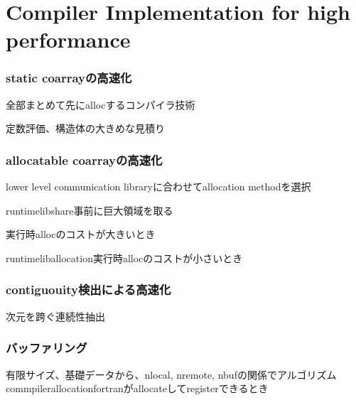 \section{Compiler Implementation for high performance}\label{sec:compiler}


\subsubsection{static coarrayの高速化}

全部まとめて先にallocするコンパイラ技術

定数評価、構造体の大きめな見積り

\subsubsection{allocatable coarrayの高速化}

lower level communication libraryに合わせてallocation methodを選択

runtimelibshare事前に巨大領域を取る

実行時allocのコストが大きいとき


runtimeliballocation実行時allocのコストが小さいとき

\subsubsection{contiguouity検出による高速化}
次元を跨ぐ連続性抽出

\subsubsection{バッファリング}
有限サイズ、基礎データから、nlocal, nremote, nbufの関係でアルゴリズム
commpilerallocationfortranがallocateしてregisterできるとき



